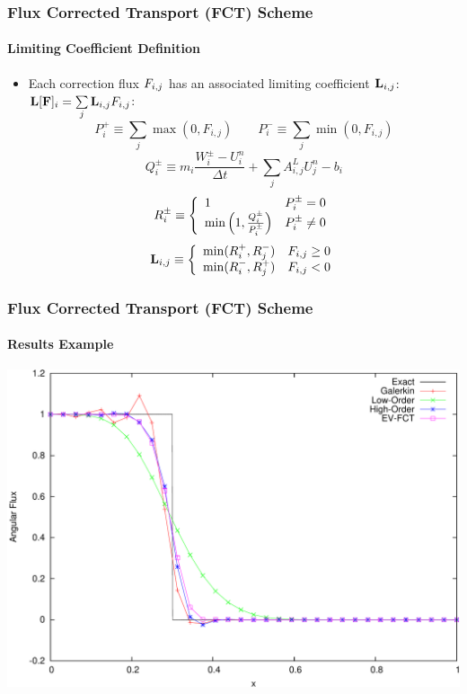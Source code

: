 \documentclass{beamer}
\begin{document}
\begin{frame}
\frametitle{Flux Corrected Transport (FCT) Scheme}
\framesubtitle{Limiting Coefficient Definition}

\begin{itemize}
   \item Each correction flux $F_{i,j}$ has an associated limiting
   coefficient $\mathbf{L}_{i,j}$: $\mathbf{L}[\mathbf{F}]_i = \sum\limits_j \mathbf{L}_{i,j} F_{i,j}$:
\begin{equation}\label{eq:P_defs}
   P_i^+ \equiv \sum\limits_j\max(0,F_{i,j}) \qquad
   P_i^- \equiv \sum\limits_j\min(0,F_{i,j})
\end{equation}
\begin{equation}\label{eq:Q_defs}
      Q_i^\pm \equiv m_i\frac{W_i^\pm-U_i^n}{\Delta t}
      + \sum\limits_j A_{i,j}^L U_j^n - b_i
\end{equation}
\begin{equation}\label{eq:R_defs}
   R_i^\pm \equiv\left\{
      \begin{array}{l l}
         1                                          & P_i^\pm = 0\\
         \min\left(1,\frac{Q_i^\pm}{P_i^\pm}\right) & P_i^\pm \ne 0
      \end{array}
      \right.
\end{equation}
\begin{equation}
   \mathbf{L}_{i,j} \equiv\left\{
      \begin{array}{l l}
         \min(R_i^+,R_j^-) & F_{i,j} \geq 0\\
         \min(R_i^-,R_j^+) & F_{i,j} < 0
      \end{array}
      \right.
\end{equation}
\end{itemize}

\end{frame}
\begin{frame}
\frametitle{Flux Corrected Transport (FCT) Scheme}
\framesubtitle{Results Example}

\includegraphics[width=\textwidth]{./figures/advection_FCT.pdf}

\end{frame}
\end{document}
